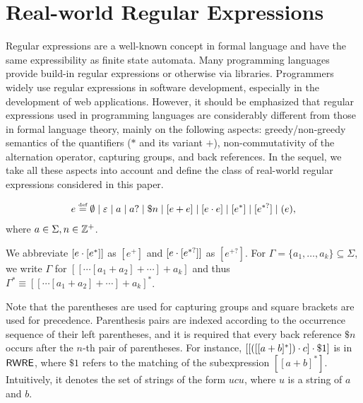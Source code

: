 
\section{Real-world Regular Expressions}
Regular expressions are a well-known concept in formal language and  have the same expressibility as finite state automata. Many programming languages provide build-in regular expressions %
or otherwise via libraries. Programmers widely use regular expressions in software development, especially in the development of web applications. However, it should be emphasized that regular expressions used in programming languages are considerably different from those in formal language theory, mainly on the following aspects: greedy/non-greedy semantics of the quantifiers ($*$ and its variant $+$), non-commutativity of the alternation operator, capturing groups, and back references. In the sequel, we take all these aspects into account and define the class of real-world regular expressions considered in this paper. 
  
\begin{definition}
  	\[e \eqdef \emptyset \mid \varepsilon \mid a \mid a? \mid \$n \mid [e + e] \mid [e \concat e] \mid [e^*] \mid [e^{*?}] \mid (e), \]
  	where $a \in \Sigma, n \in \mathbb{Z}^+$. 
\end{definition}
We abbreviate $[e \cdot [e^*]]$ as $[e^+]$ and $[e \cdot [e^{*?}]]$ as $[e^{+?}]$. For $\Gamma = \{a_1, \ldots, a_k\}\subseteq \Sigma$, we write $\Gamma$ for  $[[\cdots [a_1 + a_2] + \cdots] + a_k]$ and thus $\Gamma^\ast \equiv [[\cdots [a_1 + a_2] + \cdots] + a_k]^\ast$. 

Note that the parentheses are used for capturing groups and square brackets  are used for precedence. 
%
Parenthesis pairs are indexed according to the occurrence sequence of their left parentheses, and it is required that every back reference $\$ n$ occurs  %
after the $n$-th pair of parentheses. For instance, $[[([[a+b]^*]) \cdot c] \cdot \$1]$ is in ${\sf RWRE}$, where $\$1$ refers to the matching of the subexpression $[[a+b]^*]$. Intuitively, it denotes the set of strings of the form $u c u$, where $u$ is a string of $a$ and $b$. 
  
